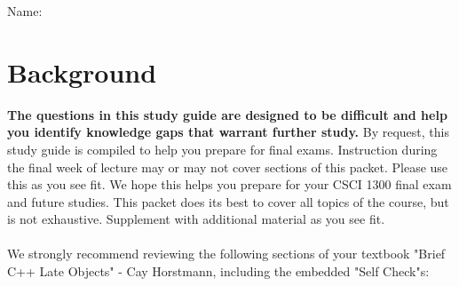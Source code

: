 \documentclass[addpoints,12pt]{exam}
\author{}
\begin{document}

\pagestyle{headandfoot}
\runningheadrule
{}
              {Name:}%
              {}
              \firstpagefooter{}{}{\thepage}
              \runningfooter{}{}{\thepage}

\section{Background}
\textbf{The questions in this study guide are designed to be difficult and help you identify knowledge gaps that warrant further study.} By request, this study guide is compiled to help you prepare for final exams. Instruction during the final week of lecture may or may not cover sections of this packet. Please use this as you see fit. We hope this helps you prepare for your CSCI 1300 final exam and future studies. This packet does its best to cover all topics of the course, but is not exhaustive. Supplement with additional material as you see fit. 
\\
\\
We strongly recommend reviewing the following sections of your textbook "Brief C++ Late Objects" - Cay Horstmann, including the embedded "Self Check"s:
\end{document}
